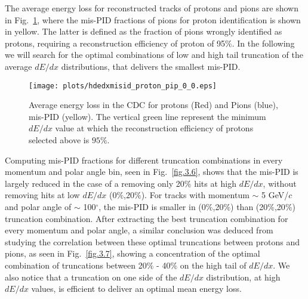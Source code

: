 The average energy loss for reconstructed tracks of protons and pions are shown in Fig.~\ref{fig.3.5}, where the mis-PID fractions of pions for proton identification is shown in yellow. The latter is defined as the fraction of pions wrongly identified as protons, requiring a reconstruction efficiency of proton of 95$\%$. In the following we will search for the optimal combinations of low and high tail truncation of the average $dE/dx$ distributions, that delivers the smallest mis-PID.

\begin{figure}[H]
    \centering
    \texttt{[image: plots/hdedxmisid\_proton\_pip\_0\_0.eps]}
    \caption{\label{fig.3.5}Average energy loss in the CDC for protons (Red) and Pions (blue), mis-PID (yellow). The vertical green line represent the minimum $dE/dx$ value at which the reconstruction efficiency of protons selected above is $95\%$.}
\end{figure}

Computing mis-PID fractions for different truncation combinations in every momentum and polar angle bin, seen in Fig.~\ref{fig.3.6}, shows that the mis-PID is largely reduced in the case of a removing only 20$\%$ hits at high $dE/dx$, without removing hits at low $dE/dx$ (0$\%$,20$\%$). For tracks with momentum $\sim$ 5 GeV/$c$ and polar angle of $\sim$ 100$^{\circ}$, the mis-PID is smaller in (0$\%$,20$\%$) than (20$\%$,20$\%$) truncation combination. After extracting the best truncation combination for every momentum and polar angle, a similar conclusion was deduced from studying the correlation between these optimal truncations between protons and pions, as seen in Fig.~\ref{fig.3.7}, showing a concentration of the optimal combination of truncations between 20$\%$ - 40$\%$ on the high tail of $dE/dx$. We also notice that a truncation on one side of the $dE/dx$ distribution, at high $dE/dx$ values, is efficient to deliver an optimal mean energy loss.

